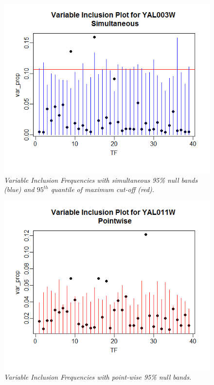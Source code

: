\documentclass[12pt]{article}
\begin{document}
\begin{figure}[H]
\centerline{\includegraphics[scale=.5]{gene3s}}
\caption{\it Variable Inclusion Frequencies with simultaneous 95\% null bands (blue) and $95^{th}$ quantile of maximum cut-off (red).}\label{fig:f1}  
\end{figure}
\begin{figure}[H]
\centerline{\includegraphics[scale=.5]{gene10p}}
\caption{\it Variable Inclusion Frequencies with point-wise 95\% null bands.}\label{fig:f1}  
\end{figure}
\end{document}
